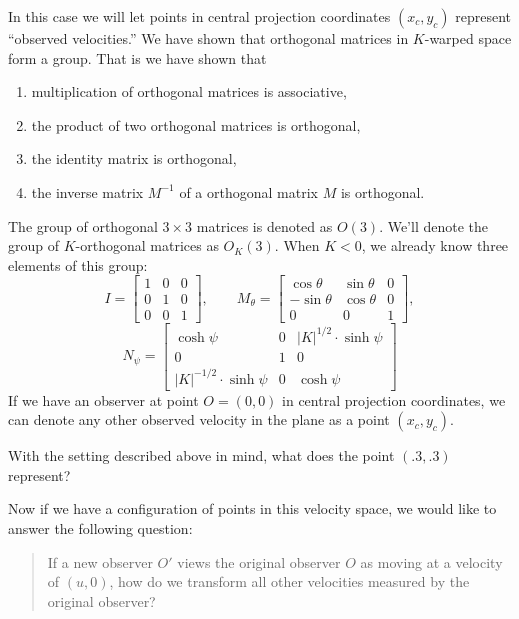 \documentclass{ximera}
\begin{document}
In this case we will let points in central projection coordinates
$(x_c,y_c)$ represent ``observed velocities.'' We have shown that
orthogonal matrices in $K$-warped space form a group. That is we have
shown that
\begin{enumerate}
\item multiplication of orthogonal matrices is associative, 
\item the product of two orthogonal matrices is orthogonal,
\item the identity matrix is orthogonal,
\item the inverse matrix $M^{-1}$ of a orthogonal matrix $M$ is orthogonal.
\end{enumerate}
The group of orthogonal $3\times 3$ matrices is denoted as
$O(3)$. We'll denote the group of $K$-orthogonal matrices as
$O_K(3)$. When $K<0$, we already know three elements of this group:
\[
I =
\begin{bmatrix}
  1 & 0 & 0\\
  0 & 1 & 0\\
  0 & 0 & 1
\end{bmatrix},
\qquad
M_\theta=
\begin{bmatrix}
  \cos\theta & \sin\theta & 0\\
  -\sin\theta & \cos\theta & 0\\
  0 & 0 & 1
\end{bmatrix},
\]
\[
N_\psi=\begin{bmatrix}
\cosh\psi & 0 & |K|^{1/2}\cdot\sinh\psi\\
0 & 1 & 0\\
|K|^{-1/2}\cdot\sinh\psi & 0 & \cosh\psi
\end{bmatrix}
\]
If we have an observer at point $O = (0,0)$ in central projection
coordinates, we can denote any other observed velocity in the plane as
a point $(x_c,y_c)$.

\begin{problem}
  With the setting described above in mind, what does the point
  $(.3,.3)$ represent?
\end{problem}

Now if we have a configuration of points in this velocity space, we
would like to answer the following question:

\begin{quote}
  If a new observer $O'$ views the original observer $O$ as moving at
  a velocity of $(u,0)$, how do we transform all other velocities
  measured by the original observer?
\end{quote}
\end{document}
